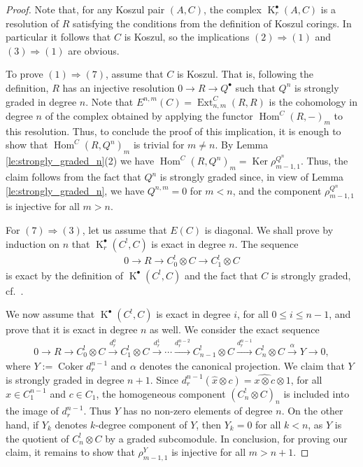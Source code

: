 \documentclass[11pt]{article}
\DeclareMathOperator{\K}{K}
\newcommand\ot{\otimes}
\newcommand{\Coker}{\operatorname{Coker}}
\renewcommand{\^}[1]{\mbox{$^{\left( #1 \right)}$}}
\renewcommand{\_}[1]{\mbox{$_{\left( #1 \right)}$}}
\newcommand{\al}{\alpha}
\numberwithin{equation}{section}
\begin{document}
\begin{proof}
Note that, for any Koszul pair $(A,C)$, the complex $\K^\bullet_r(A,C)$ is a resolution of $R$ sa\-tisfying the conditions from the def\/inition of Koszul corings. In particular it follows that $C$ is Koszul, so the implications $(2) \Longrightarrow (1)$ and $(3) \Longrightarrow (1)$ are obvious.

To prove $(1) \Longrightarrow (7)$, assume that $C$ is Koszul. That is, following the def\/inition, $R$ has an injective resolution $0 \rightarrow R \rightarrow Q^\bullet$ such that $Q^n$ is strongly graded in degree $n$. Note that $E^{n,m}(C)=\operatorname{Ext}_{n,m}^C(R,R)$ is the cohomology in degree $n$ of the complex obtained by applying the functor $\operatorname{Hom}^C(R,-)_m$ to this resolution. Thus, to conclude the proof of this implication, it is enough to show that $\operatorname{Hom}^C(R,Q^n)_m$ is trivial for $m\neq n$. By Lemma \ref{le:strongly_graded_n}(2) we have $\operatorname{Hom}^C(R,Q^n)_m=\operatorname{Ker}\rho^{Q^n}_{m-1,1}$. Thus, the claim follows from the fact that $Q^n$ is strongly graded since, in view of Lemma \ref{le:strongly_graded_n}, we have $Q^{n,m}=0$ for $m<n$, and the component $\rho^{Q^n}_{m-1,1}$ is injective for all $m>n$.

For $(7) \Longrightarrow (3)$, let us assume that $E(C)$ is diagonal. We shall prove by induction on $n$ that $\K_r^\bullet(C^!,C) $ is exact in degree $n$. The sequence
\begin{gather*}
 0\longrightarrow R\longrightarrow C_0^!\ot C\longrightarrow
 C_1^!\ot C
\end{gather*}
is exact by the def\/inition of $\K^\bullet(C^!,C)$ and the fact that $C$ is strongly graded, cf.\ \cite[Lemma~2.1]{jps}.


We now assume that $\K^\bullet(C^!,C)$ is exact in degree $i$, for all $0\leq i\leq n-1$, and prove that it is exact in degree $n$ as well. We consider the exact sequence
\begin{gather}\label{eq:sequenceC!}
 0 \rightarrow R \rightarrow C^!_0\ot C \xrightarrow{d^0_r} C_1^! \otimes C \xrightarrow{d^1_r} \cdots \xrightarrow{d^{n-2}_r} C^!_{n-1}\ot C \xrightarrow{d^{n-1}_r} C_n^! \otimes C \xrightarrow{\al}Y \rightarrow 0,
\end{gather}
where $Y:=\Coker d^{n-1}_r$ and $\al$ denotes the canonical projection. We claim that $Y$ is strongly graded in degree $n+1$. Since $d_r^{n-1}(\widehat{x}\ot c)= \widehat{x\ot c}\ot 1$, for all $x\in C_1^{n-1}$ and $c\in C_1$, the homogeneous component $(C_n^!\ot C)_n$ is included into the image of $d_r^{n-1}$. Thus $Y$ has no non-zero elements of degree $n$. On the other hand, if $Y_k$ denotes $k$-degree component of $Y$, then $Y_k=0$ for all $k<n$, as $Y$ is the quotient of $C_n^!\ot C$ by a graded subcomodule. In conclusion, for proving our claim, it remains to show that $\rho^Y_{m-1,1}$ is injective for all $m>n+1$.


\end{proof}
\end{document}
